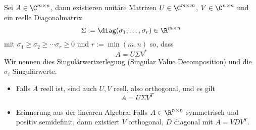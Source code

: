 \documentclass[11pt]{scrbook}
\begin{document}
\begin{st}
	\label{1.37}
	Sei $A\in \C^{m\times n}$, dann existieren unitäre Matrizen $U\in \C^{m\times m}$, $V\in \C^{n\times n}$ und ein reelle Diagonalmatrix
	\[
		\Sigma := \diag( \sigma_1, \dotsc, \sigma_r)  \in \R^{m\times n}
	\]
	mit $\sigma_1\ge \sigma_2 \ge \dotsb \sigma_r \ge 0$ und $r:= \min(m,n)$ so, dass
	\[
		A = U \Sigma V^*
	\]
	Wir nennen dies Singulärwertzerlegung (Singular Value Decomposition) und die $\sigma_i$ Singulärwerte.
	\begin{note}
		\begin{itemize}
			\item
				Falls $A$ reell ist, sind auch $U,V$ reell, also orthogonal, und es gilt
				\[
					A=U\Sigma V^T
				\]
			\item
				Erinnerung aus der linearen Algebra:
				Falls $A \in \R^{n\times n}$ symmetrisch und positiv semidefinit, dann existiert $V$ orthogonal, $D$ diagonal mit $A=VDV^T$.


\end{itemize}
\end{note}
\end{st}
\end{document}

